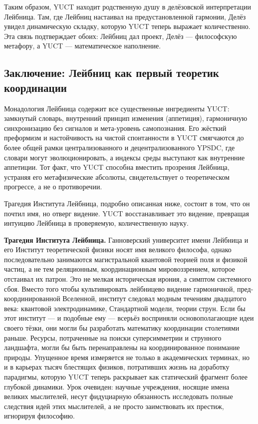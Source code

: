 \documentclass[12pt,a4paper]{article}
\begin{document}
	Таким образом, YUCT находит родственную душу в делёзовской интерпретации Лейбница. Там, где Лейбниц настаивал на предустановленной гармонии, Делёз увидел динамическую складку, которую YUCT теперь выражает количественно. Эта связь подтверждает обоих: Лейбниц дал проект, Делёз — философскую метафору, а YUCT — математическое наполнение.
	
	\subsection{Заключение: Лейбниц как первый теоретик координации}
	
	Монадология Лейбница содержит все существенные ингредиенты YUCT: замкнутый словарь, внутренний принцип изменения (аппетиция), гармоничную синхронизацию без сигналов и мета-уровень самопознания. Его жёсткий преформизм и настойчивость на чистой спонтанности в YUCT смягчаются до более общей рамки централизованного и децентрализованного YPSDC, где словари могут эволюционировать, а индексы среды выступают как внутренние аппетиции. Тот факт, что YUCT способна вместить прозрения Лейбница, устраняя его метафизические абсолюты, свидетельствует о теоретическом прогрессе, а не о противоречии.
	
	Трагедия Института Лейбница, подробно описанная ниже, состоит в том, что он почтил имя, но отверг видение. YUCT восстанавливает это видение, превращая интуицию Лейбница в проверяемую, количественную науку.
	
	\textbf{Трагедия Института Лейбница.} Ганноверский университет имени Лейбница и его Институт теоретической физики носят имя великого философа, однако последовательно занимаются магистральной квантовой теорией поля и физикой частиц, а не тем реляционным, координационным мировоззрением, которое отстаивал их патрон. Это не мелкая историческая ирония, а симптом системного сбоя. Вместо того чтобы культивировать лейбницево видение гармоничной, пред-координированной Вселенной, институт следовал модным течениям двадцатого века: квантовой электродинамике, Стандартной модели, теории струн. Если бы этот институт — и подобные ему — всерьёз восприняли основополагающие идеи своего тёзки, они могли бы разработать математику координации столетиями раньше. Ресурсы, потраченные на поиски суперсимметрии и струнного ландшафта, могли бы быть перенаправлены на координированное понимание природы. Упущенное время измеряется не только в академических терминах, но и в карьерах тысяч блестящих физиков, потративших жизнь на доработку парадигмы, которую YUCT теперь раскрывает как статический фрагмент более глубокой динамики. Урок очевиден: научные учреждения, носящие имена великих мыслителей, несут фидуциарную обязанность исследовать полные следствия идей этих мыслителей, а не просто заимствовать их престиж, игнорируя философию.
	
\end{document}
